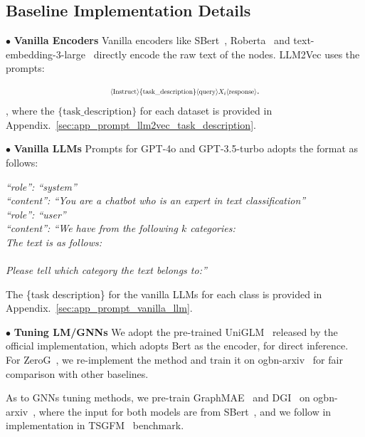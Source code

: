 \subsection{Baseline Implementation Details}
\label{sec:app_implementation_details_baseline}
$\bullet$ \textbf{Vanilla Encoders} Vanilla encoders like SBert~\cite{reimers2019sentence}, Roberta~\cite{liu2019roberta} and text-embedding-3-large~\cite{openai2024textembedding} directly encode the raw text of the nodes. LLM2Vec uses the prompts:

\begin{align}
\label{eq:vanilla_llm2vec}
\resizebox{0.43 \textwidth}{!}{$\langle\text{Instruct}\rangle \{\text{task\_description}\} \langle\text{query}\rangle {X_i} \langle\text{response}\rangle$}.
\end{align}, where the $\{\text{task\_description}\}$ for each dataset is provided in Appendix.~\ref{sec:app_prompt_llm2vec_task_description}.

$\bullet$ \textbf{Vanilla LLMs} Prompts for GPT-4o and GPT-3.5-turbo adopts the format as follows:

\label{sec:app_vanilla_LLM_implementation}
\textit{
``role'': ``system''\\
``content'': ``You are a chatbot who is an expert in text classification''\\
``role'': ``user''\\
``content'': ``We have  from the following $k$ categories: \\
The text is as follows:\\
\\
Please tell which category the text belongs to:''
}


The \{task description\} for the vanilla LLMs for each class is provided in Appendix.~\ref{sec:app_prompt_vanilla_llm}.


$\bullet$ \textbf{Tuning LM/GNNs}
We adopt the pre-trained UniGLM~\cite{fang2024uniglm} released by the official implementation, which adopts Bert as the encoder, for direct inference.
For ZeroG~\cite{li2024zerog}, we re-implement the method and train it on ogbn-arxiv~\cite{hu2020open} for fair comparison with other baselines.

As to GNNs tuning methods, we pre-train GraphMAE~\cite{hou2022graphmae} and DGI~\cite{velivckovic2018deep} on ogbn-arxiv~\cite{hu2020open}, where the input for both models are from SBert~\cite{reimers2019sentence}, and we follow in implementation in TSGFM~\cite{chen2024text} benchmark.


